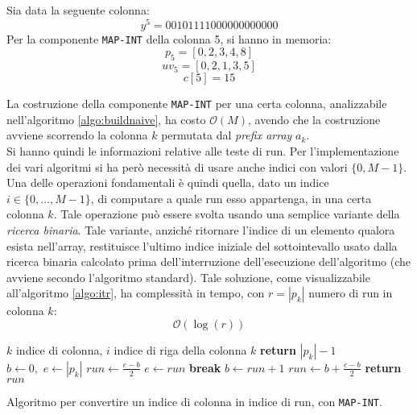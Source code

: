 \begin{esempio}
  Sia data la seguente colonna:
  \[y^5=00101111000000000000\]
  Per la componente \texttt{MAP-INT} della colonna 5, si hanno in memoria:
  \[p_5=[0,2,3,4,8]\]
  \[uv_5=[0,2,1,3,5]\]
  \[c[5]=15\]
\end{esempio}
La costruzione della componente \texttt{MAP-INT} per una certa colonna,
analizzabile nell'algoritmo 
\ref{algo:buildnaive}, ha costo $\mathcal{O}(M)$, avendo che la costruzione
avviene scorrendo la colonna $k$ permutata dal 
\textit{prefix array} $a_k$.\\
Si hanno quindi le informazioni relative alle teste di run. Per
l'implementazione dei vari algoritmi si ha però necessità di usare anche indici
con valori $\{0, M-1\}$. Una delle operazioni fondamentali è quindi
quella, dato un indice $i\in\{0,\ldots,M-1\}$, di computare a quale run esso
appartenga, in una certa colonna $k$. Tale operazione può essere svolta usando
una semplice variante della \textit{ricerca binaria}. Tale variante, anziché
ritornare l'indice di un elemento qualora esista nell'array, restituisce
l'ultimo indice iniziale del sottointevallo usato dalla ricerca binaria
calcolato prima dell'interruzione dell'esecuzione dell'algoritmo (che avviene
secondo l'algoritmo standard). Tale soluzione, come visualizzabile
all'algoritmo \ref{algo:itr}, ha complessità in tempo, con $r=|p_k|$ numero di
run in colonna $k$: 
\begin{equation}
  \label{eq:itrcomp}
  \mathcal{O}(\log (r))
\end{equation}
\begin{algorithm}
  \footnotesize
  \begin{algorithmic}[1]
    \Comment $k$ indice di colonna, $i$ indice di riga della colonna $k$
    \State \textbf{return} $|p_k|-1$
    \EndIf
    \State $b\gets 0,\,\, e \gets |p_k|$
    \State $run\gets \frac{e-b}{2}$
    \State $e\gets run$
    \Else
    \State \textbf{break}
    \EndIf
    \State $b\gets run+1$
    \EndIf
    \State $run\gets b+\frac{e-b}{2}$
    \EndWhile
    \State \textbf{return} $run$
    \EndFunction
  \end{algorithmic}
  \caption{Algoritmo per convertire un indice di colonna in indice di run, con
    \texttt{MAP-INT}.} 
  \label{algo:itr}
\end{algorithm}

